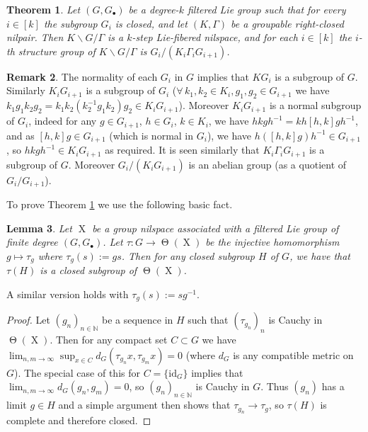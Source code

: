 \documentclass[a4paper,12pt,reqno]{amsart}
\newtheorem{theorem}{Theorem}[section]
\newtheorem{lemma}[theorem]{Lemma}
\theoremstyle{definition}
\newtheorem{remark}[theorem]{Remark}
\def\to{\rightarrow}
\newcommand{\mb}{\mathbb}
\newcommand{\id}{\mathrm{id}}
\DeclareMathOperator{\tran}{\Theta}
\DeclareMathOperator{\ns}{X}
\begin{document}
\begin{theorem}\label{thm:top-double-coset}
Let $(G,G_\bullet)$ be a degree-$k$ filtered Lie group such that for every $i\in [k]$ the subgroup $G_i$ is closed, and let $(K,{\Gamma})$ be a groupable right-closed nilpair. Then  $K\backslash G/{\Gamma}$ is a $k$-step Lie-fibered nilspace, and for each $i\in [k]$ the $i$-th structure group of $K\backslash G/ \Gamma$ is $G_i/(K_i \Gamma_i G_{i+1})$.
\end{theorem}
\begin{remark}
The normality of each $G_i$ in $G$ implies that $KG_i$ is a subgroup of $G$. Similarly $K_iG_{i+1}$ is a  subgroup of $G_i$ ($\forall\, k_1,k_2\in K_i, g_1,g_2\in G_{i+1}$ we have $k_1g_1k_2g_2=k_1k_2(k_2^{-1}g_1k_2)g_2\in K_i G_{i+1}$). Moreover $K_iG_{i+1}$ is a normal subgroup of $G_i$, indeed for any $g\in G_{i+1}$, $h\in G_i$, $k\in K_i$, we have  $hkgh^{-1} = kh[h,k]gh^{-1}$, and as $[h,k]g\in  G_{i+1}$ (which is normal in $G_i$), we have $h([h,k]g)h^{-1}\in G_{i+1}$, so $hkgh^{-1} \in K_iG_{i+1}$ as required. It is seen similarly that $K_i \Gamma_i G_{i+1}$ is a subgroup of $G$. Moreover $G_i/(K_iG_{i+1})$ is an abelian group (as a quotient of  $G_i/G_{i+1}$). 
\end{remark}
To prove Theorem \ref{thm:top-double-coset} we use the following basic fact.
\begin{lemma}\label{lem:closed-group-as-trans}
Let $\ns$ be a group nilspace associated with a filtered Lie group of finite degree $(G,G_\bullet)$. Let $\tau:G\to \tran(\ns)$ be the injective homomorphism $g\mapsto \tau_g$ where $\tau_g(s):=gs$. Then for any closed subgroup $H$ of $G$, we have that $\tau(H)$ is a closed subgroup of $\tran(\ns)$.
\end{lemma}
A similar version holds with $\tau_g(s):=sg^{-1}$.
\begin{proof}
Let $(g_n)_{n\in \mb{N}}$ be a sequence in $H$ such that $(\tau_{g_n})_n$ is Cauchy in $\tran(\ns)$. Then for any compact set $C\subset G$ we have $\lim_{n,m\to\infty} \sup_{x\in C}d_G(\tau_{g_n}x,\tau_{g_m}x)=0$ (where $d_G$ is any compatible metric on $G$). The special case of this for $C=\{\id_G\}$ implies that $\lim_{n,m\to\infty} d_G(g_n,g_m)=0$, so $(g_n)_{n\in\mb{N}}$ is Cauchy in $G$. Thus $(g_n)$ has a limit $g\in H$ and a simple argument then shows that $\tau_{g_n}\to \tau_g$, so $\tau(H)$ is complete and therefore closed.
\end{proof}
\end{document}
